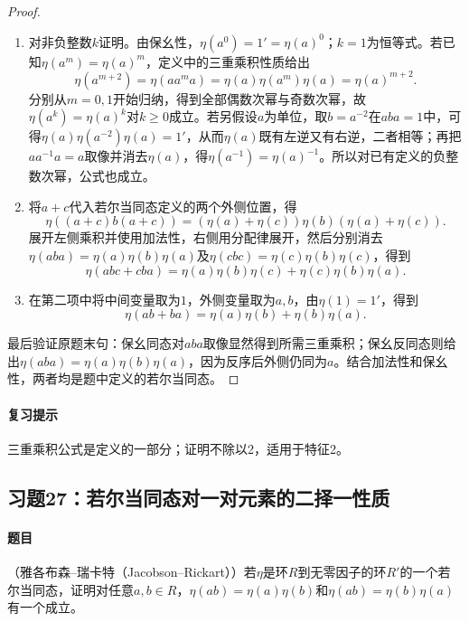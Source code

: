 \begin{proof}

\begin{enumerate}[label=(\roman*)]
\item 对非负整数$k$证明。由保幺性，$\eta(a^0)=1'=\eta(a)^0$；$k=1$为恒等式。若已知$\eta(a^m)=\eta(a)^m$，定义中的三重乘积性质给出
\[
\eta(a^{m+2})=\eta(aa^ma)=\eta(a)\eta(a^m)\eta(a)=\eta(a)^{m+2}.
\]
分别从$m=0,1$开始归纳，得到全部偶数次幂与奇数次幂，故$\eta(a^k)=\eta(a)^k$对$k\ge0$成立。若另假设$a$为单位，取$b=a^{-2}$在$aba=1$中，可得$\eta(a)\eta(a^{-2})\eta(a)=1'$，从而$\eta(a)$既有左逆又有右逆，二者相等；再把$aa^{-1}a=a$取像并消去$\eta(a)$，得$\eta(a^{-1})=\eta(a)^{-1}$。所以对已有定义的负整数次幂，公式也成立。
\item 将$a+c$代入若尔当同态定义的两个外侧位置，得
\[
\eta((a+c)b(a+c))=(\eta(a)+\eta(c))\eta(b)(\eta(a)+\eta(c)).
\]
展开左侧乘积并使用加法性，右侧用分配律展开，然后分别消去$\eta(aba)=\eta(a)\eta(b)\eta(a)$及$\eta(cbc)=\eta(c)\eta(b)\eta(c)$，得到
\[
\eta(abc+cba)=\eta(a)\eta(b)\eta(c)+\eta(c)\eta(b)\eta(a).
\]
\item 在第二项中将中间变量取为$1$，外侧变量取为$a,b$，由$\eta(1)=1'$，得到
\[
\eta(ab+ba)=\eta(a)\eta(b)+\eta(b)\eta(a).
\]
\end{enumerate}
最后验证原题末句：保幺同态对$aba$取像显然得到所需三重乘积；保幺反同态则给出$\eta(aba)=\eta(a)\eta(b)\eta(a)$，因为反序后外侧仍同为$a$。结合加法性和保幺性，两者均是题中定义的若尔当同态。

\end{proof}

\paragraph{复习提示}

三重乘积公式是定义的一部分；证明不除以2，适用于特征2。



\subsection{习题27：若尔当同态对一对元素的二择一性质}

\label{ex:3:27}

\paragraph{题目}

（雅各布森--瑞卡特（Jacobson--Rickart））若$\eta$是环$R$到无零因子的环$R'$的一个若尔当同态，证明对任意$a,b\in R$，$\eta(ab)=\eta(a)\eta(b)$和$\eta(ab)=\eta(b)\eta(a)$有一个成立。

